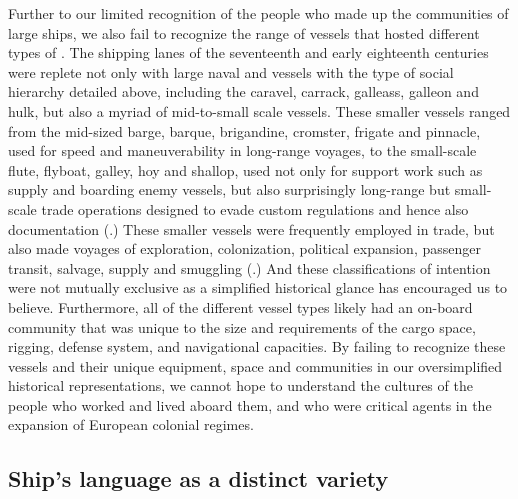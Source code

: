 Further to our limited recognition of the people who made up the communities of large ships, we also fail to recognize the range of vessels that hosted different types of . The shipping lanes of the seventeenth and early eighteenth centuries were replete not only with large naval and  vessels with the type of social hierarchy detailed above, including the caravel, carrack, galleass, galleon and hulk, but also a myriad of mid-to-small scale vessels. These smaller vessels ranged from the mid-sized barge, barque, brigandine, cromster, frigate and pinnacle, used for speed and maneuverability in long-range voyages, to the small-scale flute, flyboat, galley, hoy and shallop, used not only for support work such as supply and boarding enemy vessels, but also surprisingly long-range but small-scale trade operations designed to evade custom regulations and hence also documentation (\citealt{Bicheno2012}.) These smaller vessels were frequently employed in trade, but also made voyages of exploration, colonization, political expansion, passenger transit, salvage, supply and smuggling (\citealt{Jarvis2010}.) And these classifications of intention were not mutually exclusive as a simplified historical glance has encouraged us to believe. Furthermore, all of the different vessel types likely had an on-board community that was unique to the size and requirements of the cargo space, rigging, defense system, and navigational capacities. By failing to recognize these vessels and their unique equipment, space and communities in our oversimplified historical representations, we cannot hope to understand the cultures of the people who worked and lived aboard them, and who were critical agents in the expansion of European colonial regimes. 



\subsection{{Ship’s language as a distinct variety}}\label{sec:1.1.2}



